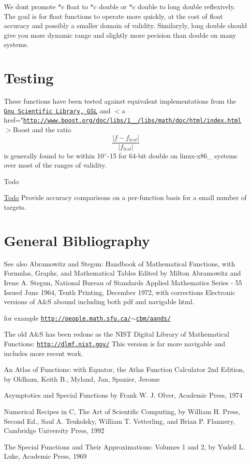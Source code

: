 We don\textquotesingle{}t promote $\ast$c float to $\ast$c double or $\ast$c double to {\ttfamily long double} reflexively. The goal is for float functions to operate more quickly, at the cost of float accuracy and possibly a smaller domain of validity. Similaryly, {\ttfamily long double} should give you more dynamic range and slightly more pecision than {\ttfamily double} on many systems.\hypertarget{index_testing}{}\section{Testing}\label{index_testing}
These functions have been tested against equivalent implementations from the \href{http://www.gnu.org/software/gsl}{\tt Gnu Scientific Library, G\+S\+L} and $<$a href="\href{http://www.boost.org/doc/libs/1_60_0/libs/math/doc/html/index.html}{\tt http\+://www.\+boost.\+org/doc/libs/1\+\_\+\_/libs/math/doc/html/index.\+html}$>$Boost and the ratio \[ \frac{|f - f_{test}|}{|f_{test}|} \] is generally found to be within 10$^\wedge$-\/15 for 64-\/bit double on linux-\/x86\+\_ systems over most of the ranges of validity.

\begin{DoxyRefDesc}{Todo}
\item[\hyperlink{todo__todo000001}{Todo}]Provide accuracy comparisons on a per-\/function basis for a small number of targets.\end{DoxyRefDesc}
\hypertarget{index_bibliography}{}\section{General Bibliography}\label{index_bibliography}
\begin{DoxySeeAlso}{See also}
Abramowitz and Stegun\+: Handbook of Mathematical Functions, with Formulas, Graphs, and Mathematical Tables Edited by Milton Abramowitz and Irene A. Stegun, National Bureau of Standards Applied Mathematics Series -\/ 55 Issued June 1964, Tenth Printing, December 1972, with corrections Electronic versions of A\&S abound including both pdf and navigable html. 

for example \href{http://people.math.sfu.ca/~cbm/aands/}{\tt http\+://people.\+math.\+sfu.\+ca/$\sim$cbm/aands/}

The old A\&S has been redone as the N\+I\+S\+T Digital Library of Mathematical Functions\+: \href{http://dlmf.nist.gov/}{\tt http\+://dlmf.\+nist.\+gov/} This version is far more navigable and includes more recent work.

An Atlas of Functions\+: with Equator, the Atlas Function Calculator 2nd Edition, by Oldham, Keith B., Myland, Jan, Spanier, Jerome

Asymptotics and Special Functions by Frank W. J. Olver, Academic Press, 1974

Numerical Recipes in C, The Art of Scientific Computing, by William H. Press, Second Ed., Saul A. Teukolsky, William T. Vetterling, and Brian P. Flannery, Cambridge University Press, 1992

The Special Functions and Their Approximations\+: Volumes 1 and 2, by Yudell L. Luke, Academic Press, 1969 
\end{DoxySeeAlso}
